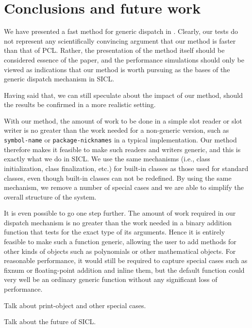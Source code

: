 \section{Conclusions and future work}

We have presented a fast method for generic dispatch in \cl{}.
Clearly, our tests do not represent any scientifically convincing
argument that our method is faster than that of PCL.  Rather, the
presentation of the method itself should be considered essence of the
paper, and the performance simulations should only be viewed as
indications that our method is worth pursuing as the bases of the
generic dispatch mechanism in SICL. 

Having said that, we can still speculate about the impact of our
method, should the results be confirmed in a more realistic setting. 

With our method, the amount of work to be done in a simple slot reader
or slot writer is no greater than the work needed for a non-generic
version, such as \texttt{symbol-name} or \texttt{package-nicknames} in
a typical \cl{} implementation.  Our method therefore makes it
feasible to make such readers and writers generic, and this is exactly
what we do in SICL.  We use the same \clos{} mechanisms (i.e., class
initialization, class finalization, etc.) for built-in classes as
those used for standard classes, even though built-in classes can not
be redefined.  By using the same mechanism, we remove a number of
special cases and we are able to simplify the overall structure of the
system. 

It is even possible to go one step further.  The amount of work
required in our dispatch mechanism is no greater than the work needed
in a binary addition function that tests for the exact type of its
arguments.  Hence it is entirely feasible to make such a function
generic, allowing the user to add methods for other kinds of objects
such as polynomials or other mathematical objects.  For reasonable
performance, it would still be required to capture special cases such
as fixnum or floating-point addition and inline them, but the default
function could very well be an ordinary generic function without any
significant loss of performance. 

Talk about print-object and other special cases.

Talk about the future of SICL.
 
